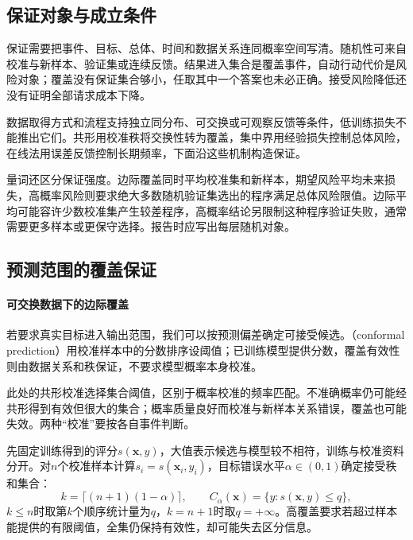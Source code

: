 \subsection{保证对象与成立条件}

保证需要把事件、目标、总体、时间和数据关系连同概率空间写清。随机性可来自校准与新样本、验证集或连续反馈。结果进入集合是覆盖事件，自动行动代价是风险对象；覆盖没有保证集合够小，任取其中一个答案也未必正确。接受风险降低还没有证明全部请求成本下降。

数据取得方式和流程支持独立同分布、可交换或可观察反馈等条件，低训练损失不能推出它们。共形用校准秩将交换性转为覆盖，集中界用经验损失控制总体风险，在线法用误差反馈控制长期频率，下面沿这些机制构造保证。

量词还区分保证强度。边际覆盖同时平均校准集和新样本，期望风险平均未来损失，高概率风险则要求绝大多数随机验证集选出的程序满足总体风险限值。边际平均可能容许少数校准集产生较差程序，高概率结论另限制这种程序验证失败，通常需要更多样本或更保守选择。报告时应写出每层随机对象。

\subsection{预测范围的覆盖保证}

\paragraph{可交换数据下的边际覆盖}

若要求真实目标进入输出范围，我们可以按预测偏差确定可接受候选。（conformal prediction）用校准样本中的分数排序设阈值；已训练模型提供分数，覆盖有效性则由数据关系和秩保证，不要求模型概率本身校准。

此处的共形校准选择集合阈值，区别于概率校准的频率匹配。不准确概率仍可能经共形得到有效但很大的集合；概率质量良好而校准与新样本关系错误，覆盖也可能失效。两种“校准”要按各自事件判断。

先固定训练得到的评分$s(\bm{x},y)$，大值表示候选与模型较不相符，训练与校准资料分开。对$n$个校准样本计算$s_i=s(\bm{x}_i,y_i)$，目标错误水平$\alpha\in(0,1)$确定接受秩和集合：
\begin{equation}
 k=\lceil(n+1)(1-\alpha)\rceil,\qquad
 C_\alpha(\bm{x})=\{y:s(\bm{x},y)\leq q\},
 \label{eq:reliability-conformal-set}
\end{equation}
$k\leq n$时取第$k$个顺序统计量为$q$，$k=n+1$时取$q=+\infty$。高覆盖要求若超过样本能提供的有限阈值，全集仍保持有效性，却可能失去区分信息。

